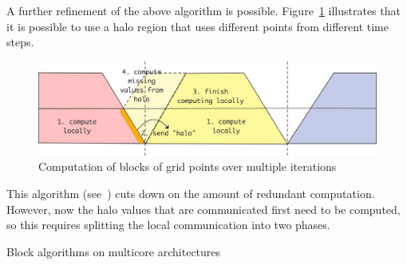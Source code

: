 A further refinement of the above algorithm is possible.
Figure~\ref{fig:grid-update-minimal} illustrates that it is possible
to use a halo region that uses different points from different time steps.
\begin{figure}[ht]
\includegraphics[scale=.1]{graphics/grid-update-minimal}
\caption{Computation of blocks of grid points over multiple iterations}
\label{fig:grid-update-minimal}
\end{figure}
This algorithm (see~\cite{Demmel2008IEEE:avoiding}) cuts down on the amount
of redundant computation. However, now the halo values that are communicated
first need to be computed, so this requires splitting the local communication
into two phases.

 {Block algorithms on multicore architectures}
\label{sec:multicore-block}


